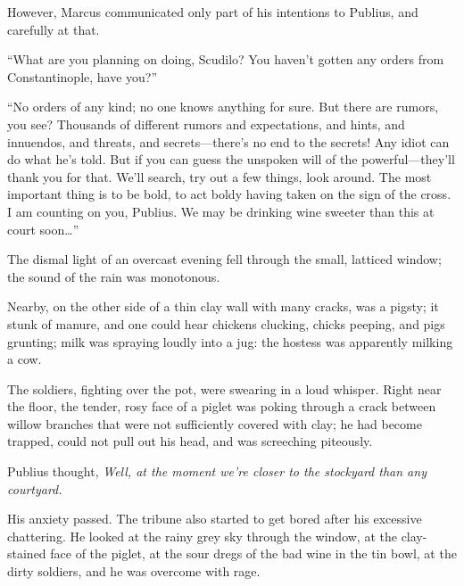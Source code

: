 However, Marcus communicated only part of his intentions to Publius, and carefully at that.

``What are you planning on doing, Scudilo? You haven't gotten any orders from Constantinople, have you?'' %

``No orders of any kind; no one knows anything for sure. But there are rumors, you see? Thousands of different rumors and expectations, and hints, and innuendos, and threats, and secrets---there's no end to the secrets! Any idiot can do what he's told. But if you can guess the unspoken will of the powerful---they'll thank you for that. We'll search, try out a few things, look around. The most important thing is to be bold, to act boldy having taken on the sign of the cross. I am counting on you, Publius. We may be drinking wine sweeter than this at court soon\ldots{}'' %

The dismal light of an overcast evening fell through the small, latticed window; the sound of the rain was monotonous.

Nearby, on the other side of a thin clay wall with many cracks, was a pigsty; it stunk of manure, and one could hear chickens clucking, chicks peeping, and pigs grunting; milk was spraying loudly into a jug: the hostess was apparently milking a cow.

The soldiers, fighting over the pot, were swearing in a loud whisper. Right near the floor, the tender, rosy face of a piglet was poking through a crack between willow branches that were not sufficiently covered with clay; he had become trapped, could not pull out his head, and was screeching piteously.

Publius thought, \textit{Well, at the moment we're closer to the stockyard than any courtyard.}

His anxiety passed. The tribune also started to get bored after his excessive chattering. He looked at the rainy grey sky through the window, at the clay-stained face of the piglet, at the sour dregs of the bad wine in the tin bowl, at the dirty soldiers, and he was overcome with rage.
